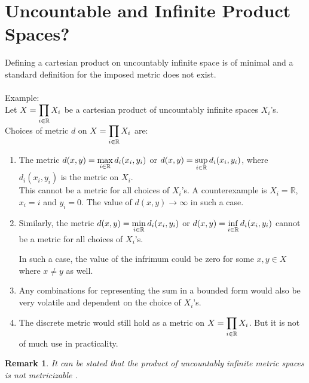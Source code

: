 \documentclass[12pt]{article}
\newtheorem{remark}{Remark}[section]
\begin{document}
\section{Uncountable and Infinite Product Spaces?}
Defining a cartesian product on uncountably infinite space is of minimal and a standard definition for the imposed metric does not exist. 
\\
\\
Example:
\\
Let $\mathlarger{X = \prod_{i \in \mathbb{R}}X_i}$ be a cartesian product of uncountably infinite spaces $X_i$'s. 
\\
Choices of metric $d$ on $\mathlarger{X = \prod_{i \in \mathbb{R}}X_i}$ are:
\begin{enumerate}
    \item {
        The metric $\mathlarger{d(x,y) = \max_{i \in \mathbb{R}}d_i(x_i,y_i)}$ or $\mathlarger{d(x,y) = \sup_{i \in \mathbb{R}}d_i(x_i,y_i)}$, where $d_i(x_i,y_i)$ is the metric on $X_i$. 
        \\
        This cannot be a metric for all choices of $X_i$'s. A counterexample is $X_i = \mathbb{R}$, $x_i = i$ and $y_i = 0$. The value of $d(x,y) \to \infty$ in such a case.
    }
    \item {
        Similarly, the metric $\mathlarger{d(x,y) = \min_{i \in \mathbb{R}}d_i(x_i,y_i)}$ or $\mathlarger{d(x,y) = \inf_{i \in \mathbb{R}}d_i(x_i,y_i)}$ cannot be a metric for all choices of $X_i$'s. 

        In such a case, the value of the infrimum could be zero for some $x, y \in X$ where $x \ne y$ as well.
    }
    \item Any combinations for representing the sum in a bounded form would also be very volatile and dependent on the choice of $X_i$'s.
    \item The discrete metric would still hold as a metric on $\mathlarger{X = \prod_{i \in \mathbb{R}}X_i}$. But it is not of much use in practicality. 
\end{enumerate}

\begin{remark}
    It can be stated that the product of uncountably infinite metric spaces is not metricizable \cite{infinite}.
\end{remark}

\nocite{*}


\end{document}
